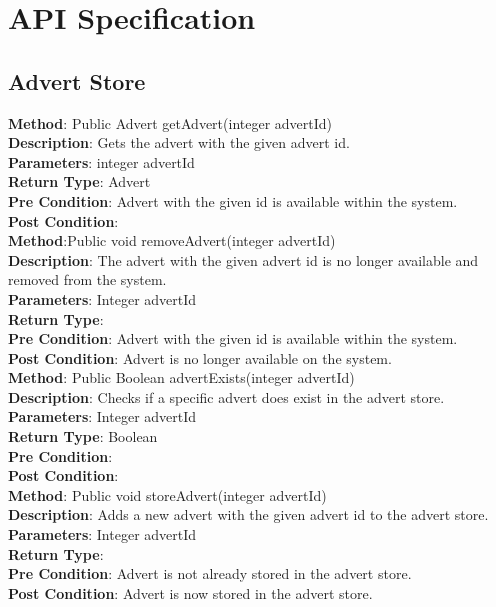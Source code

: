 \documentclass{l3deliverable}
\begin{document}

\section{API Specification}


\subsection{Advert Store}

\textbf{Method}: Public Advert getAdvert(integer advertId)\\
\textbf{Description}: Gets the advert with the given advert id.\\
\textbf{Parameters}: integer advertId\\
\textbf{Return Type}: Advert\\
\textbf{Pre Condition}: Advert with the given id is available within the system. \\
\textbf{Post Condition}: \\

\textbf{Method}:Public void removeAdvert(integer advertId)\\
\textbf{Description}: The advert with the given advert id is no longer available and removed from the system.\\
\textbf{Parameters}: Integer advertId\\
\textbf{Return Type}: \\
\textbf{Pre Condition}: Advert with the given id is available within the system.\\
\textbf{Post Condition}: Advert is no longer available on the system.\\

\textbf{Method}: Public Boolean advertExists(integer advertId)\\
\textbf{Description}: Checks if a specific advert does exist in the advert store.\\
\textbf{Parameters}: Integer advertId\\
\textbf{Return Type}: Boolean\\
\textbf{Pre Condition}:\\
\textbf{Post Condition}:\\

\textbf{Method}: Public void storeAdvert(integer advertId)\\
\textbf{Description}: Adds a new advert with the given advert id to the advert store. \\
\textbf{Parameters}: Integer advertId\\
\textbf{Return Type}: \\
\textbf{Pre Condition}: Advert is not already stored in the advert store.\\
\textbf{Post Condition}: Advert is now stored in the advert store.\\
\end{document}
